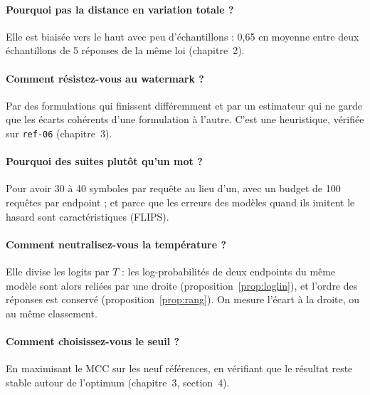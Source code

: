 \documentclass[11pt,a4paper]{report}
\theoremstyle{definition}
\theoremstyle{plain}
\newcommand{\code}[1]{\texttt{#1}}
\begin{document}
\paragraph{Pourquoi pas la distance en variation totale ?} Elle est biaisée vers le haut avec peu d'échantillons : 0,65 en moyenne entre deux échantillons de 5 réponses de la même loi (chapitre~2).

\paragraph{Comment résistez-vous au watermark ?} Par des formulations qui finissent différemment et par un estimateur qui ne garde que les écarts cohérents d'une formulation à l'autre. C'est une heuristique, vérifiée sur \code{ref-06} (chapitre~3).

\paragraph{Pourquoi des suites plutôt qu'un mot ?} Pour avoir 30 à 40 symboles par requête au lieu d'un, avec un budget de 100 requêtes par endpoint ; et parce que les erreurs des modèles quand ils imitent le hasard sont caractéristiques (FLIPS).

\paragraph{Comment neutralisez-vous la température ?} Elle divise les logits par $T$ : les log-probabilités de deux endpoints du même modèle sont alors reliées par une droite (proposition~\ref{prop:loglin}), et l'ordre des réponses est conservé (proposition~\ref{prop:rang}). On mesure l'écart à la droite, ou au même classement.

\paragraph{Comment choisissez-vous le seuil ?} En maximisant le MCC sur les neuf références, en vérifiant que le résultat reste stable autour de l'optimum (chapitre~3, section~4).

\end{document}
